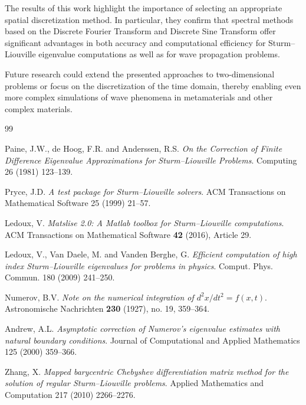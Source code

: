 \documentclass[11pt,a4paper,oneside,openright]{report} %
\begin{document}
The results of this work highlight the importance of selecting an appropriate spatial discretization method. In particular, they confirm that spectral methods based on the Discrete Fourier Transform and Discrete Sine Transform offer significant advantages in both accuracy and computational efficiency for Sturm--Liouville eigenvalue computations as well as for wave propagation problems.

Future research could extend the presented approaches to two-dimensional problems or focus on the discretization of the time domain, thereby enabling even more complex simulations of wave phenomena in metamaterials and other complex materials.







\begin{thebibliography}{99}

    {\sc Paine, J.\;W., de Hoog, F.\;R. and Anderssen, R.\;S.}
    \emph{On the Correction of Finite Difference Eigenvalue Approximations for Sturm--Liouville Problems}.
    Computing 26 (1981) 123--139.

    {\sc Pryce, J.\;D.}
    \emph{A test package for Sturm--Liouville solvers}.
    ACM Transactions on Mathematical Software 25 (1999) 21--57.

    {\sc Ledoux, V.}
    \emph{Matslise 2.0: A Matlab toolbox for Sturm--Liouville computations}.
    ACM Transactions on Mathematical Software \textbf{42} (2016), Article 29.

    {\sc Ledoux, V., Van Daele, M. and Vanden Berghe, G.}
    \emph{Efficient computation of high index Sturm--Liouville eigenvalues for problems in physics}.
    Comput. Phys. Commun. 180 (2009) 241--250.

    {\sc Numerov, B.\;V.}
    \emph{Note on the numerical integration of $d^2x/dt^2 = f(x, t)$}.
    Astronomische Nachrichten \textbf{230} (1927), no. 19, 359--364.

    {\sc Andrew, A.\;L.}
    \emph{Asymptotic correction of Numerov's eigenvalue estimates with natural boundary conditions}.
    Journal of Computational and Applied Mathematics 125 (2000) 359--366.

    {\sc Zhang, X.}
    \emph{Mapped barycentric Chebyshev differentiation matrix method for the solution of regular Sturm--Liouville problems}.
    Applied Mathematics and Computation 217 (2010) 2266--2276.


\end{thebibliography}
\end{document}
